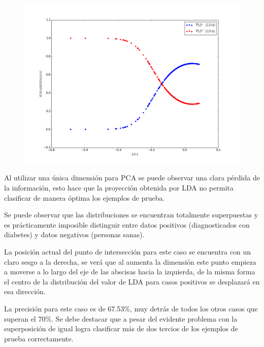 \documentclass[letter, titlepage, 10pt]{article}
\begin{document}
\begin{figure}[H]
\begin{minipage}{.5\textwidth}
    \end{minipage}
    \begin{minipage}{.5\textwidth}
        \centering
        \includegraphics[width=1\linewidth]{images/CP_D1}
    \end{minipage}
\end{figure}
Al utilizar una única dimensión para PCA se puede observar una clara pérdida de la información, esto hace que la proyección obtenida por LDA no permita clasificar de manera óptima los ejemplos de prueba. 

Se puede observar que las distribuciones se encuentran totalmente superpuestas y es prácticamente imposible distinguir entre datos positivos (diagnosticados con diabetes) y datos negativos (personas sanas). 

La posición actual del punto de intersección para este caso se encuentra con un claro sesgo a la derecha, se verá que al aumenta la dimensión este punto empieza a moverse a lo largo del eje de las abscisas hacia la izquierda, de la misma forma el centro de la distribución del valor de LDA para casos positivos se desplazará en esa dirección.

La precisión para este caso es de 67.53\%, muy detrás de todos los otros casos que superan el 70\%. Se debe destacar que a pesar del evidente problema con la superposición de igual logra clasificar más de dos tercios de los ejemplos de prueba correctamente.

\newpage
\end{document}
